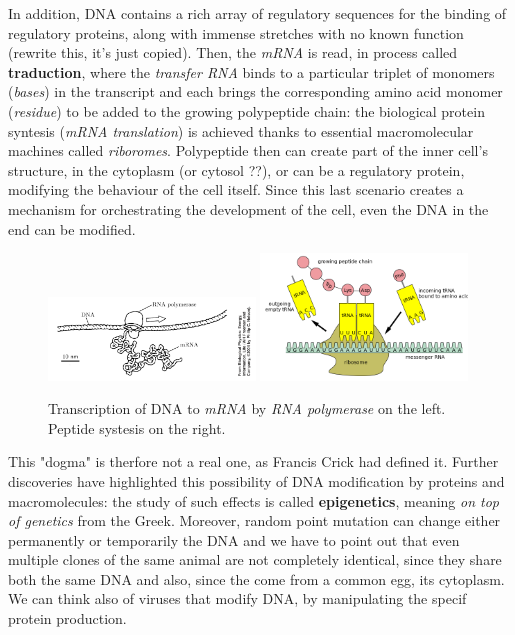 \documentclass[../main/main.tex]{subfiles}
\begin{document}
In addition, DNA contains a rich array of regulatory sequences for the binding of regulatory proteins, along with immense stretches with no known function (rewrite this, it's just copied). 
Then, the \emph{mRNA} is read, in process called \textbf{traduction}, where the \emph{transfer RNA} binds to a particular triplet of monomers (\emph{bases}) in the transcript and each brings the corresponding amino acid monomer (\emph{residue}) to be added to the growing polypeptide chain: the biological protein syntesis (\emph{mRNA translation}) is achieved thanks to essential macromolecular machines called \emph{riboromes}. Polypeptide then can create part of the inner cell's structure, in the cytoplasm (or cytosol ??), or can be a regulatory protein, modifying the behaviour of the cell itself. 
Since this last scenario creates a mechanism for orchestrating the development of the cell, even the DNA in the end can be modified.
\begin{figure}[h!]
    \centering
    \includegraphics[width=0.49\textwidth]{../frontespizio/tikz/4_lesson/RNA_polymerase.PNG}
    \includegraphics[width=0.49\textwidth]{../frontespizio/tikz/4_lesson/Peptide_syn.png}
    \caption{Transcription of DNA to \emph{mRNA} by \emph{RNA polymerase} on the left. Peptide systesis on the right.}
\end{figure}
This "dogma" is therfore not a real one, as Francis Crick had defined it. Further discoveries have highlighted this possibility of DNA modification by proteins and macromolecules: the study of such effects is called \textbf{epigenetics}, meaning \emph{on top of genetics} from the Greek. Moreover, random point mutation can change either permanently or temporarily the DNA and we have to point out that even multiple clones of the same animal are not completely identical, since they share both the same DNA and also, since the come from a common egg, its cytoplasm. 
We can think also of viruses that modify DNA, by manipulating the specif protein production.   
\end{document}
